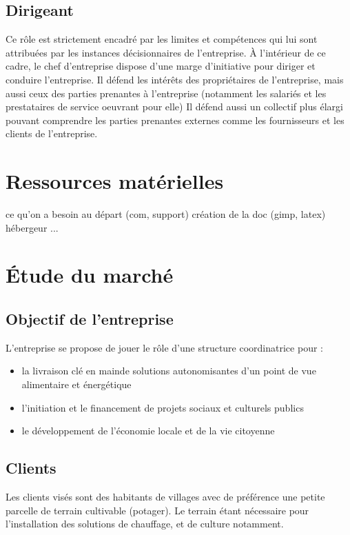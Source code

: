 \documentclass[10pt]{article}
\begin{document}
\subsection{Dirigeant}
\label{sec:dirigeant}
Ce rôle est strictement encadré par les limites et compétences qui lui sont attribuées par les instances décisionnaires de l'entreprise. À l'intérieur de ce cadre, le chef d'entreprise dispose d'une marge d'initiative pour diriger et conduire l'entreprise.
Il défend les intérêts des propriétaires de l'entreprise, mais aussi ceux des parties prenantes à l'entreprise (notamment les salariés et les prestataires de service oeuvrant pour elle)
Il défend aussi un collectif plus élargi pouvant comprendre les parties prenantes externes comme les fournisseurs et  les clients de l'entreprise.


\section{Ressources matérielles}
\label{sec:ressources}
ce qu'on a besoin au départ (com, support)
création de la doc (gimp, latex)
hébergeur ...

\section{Étude du marché}
\label{sec:marche}

\subsection{Objectif de l'entreprise}
\label{sec:objectifs}

L'entreprise se propose de jouer le rôle d'une structure coordinatrice pour :
\begin{itemize}
	\item la livraison \og{}clé en main\fg{~}de solutions autonomisantes d'un point de vue alimentaire et énergétique
	\item l'initiation et le financement de projets sociaux et culturels publics
	\item le développement de l'économie locale et de la vie citoyenne
\end{itemize}



\subsection{Clients}
\label{sub:client}
Les clients visés sont des habitants de villages avec de préférence une petite parcelle de terrain cultivable (potager).
Le terrain étant nécessaire pour l'installation des solutions de chauffage, et de culture notamment.
\end{document}
